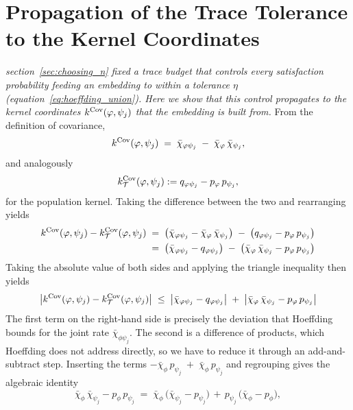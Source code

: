\documentclass[titlepage,a4paper,11pt]{report}
\begin{document}
\section{Propagation of the Trace Tolerance to the Kernel Coordinates}\label{app:tolerance_derivation}
    \emph{section~\ref{sec:choosing_n} fixed a trace budget that controls every satisfaction probability feeding an embedding to within a tolerance $\eta$ (equation~\eqref{eq:hoeffding_union}). Here we show that this control propagates to the kernel coordinates $k^{\mathrm{Cov}}(\varphi,\psi_j)$ that the embedding is built from.} From the definition of covariance,
    \begin{equation}\label{eq:kcov_decomposition}
        k^{\mathrm{Cov}}(\varphi, \psi_j) \;=\;\bar\chi_{\varphi\psi_j} \;-\; \bar\chi_\varphi\, \bar\chi_{\psi_j},
    \end{equation}
    and analogously 
    \begin{equation}
        k^{\mathrm{Cov}}_\mathcal{T}(\varphi, \psi_j) := q_{\varphi\psi_j} - p_\varphi\, p_{\psi_j},
    \end{equation} for the population kernel. Taking the difference between the two and rearranging yields
    \begin{align*}
        k^{\mathrm{Cov}}(\varphi, \psi_j) - k^{\mathrm{Cov}}_\mathcal{T}(\varphi, \psi_j)
        &\;=\; \bigl(\bar\chi_{\varphi\psi_j} - \bar\chi_\varphi\, \bar\chi_{\psi_j}\bigr) \;-\; \bigl(q_{\varphi\psi_j} - p_\varphi\, p_{\psi_j}\bigr) \\
        &\;=\; \bigl(\bar\chi_{\varphi\psi_j} - q_{\varphi\psi_j}\bigr) \;-\; \bigl(\bar\chi_\varphi\, \bar\chi_{\psi_j} - p_\varphi\, p_{\psi_j}\bigr)
    \end{align*}
    Taking the absolute value of both sides and applying the triangle inequality then yields
    \begin{equation}\label{eq:kcov_outer_triangle}
        \bigl|k^{\mathrm{Cov}}(\varphi, \psi_j) - k^{\mathrm{Cov}}_\mathcal{T}(\varphi, \psi_j)\bigr| \;\le\; \bigl|\bar\chi_{\varphi\psi_j} - q_{\varphi\psi_j}\bigr| \;+\; \bigl|\bar\chi_\varphi\, \bar\chi_{\psi_j} - p_\varphi\, p_{\psi_j}\bigr|
    \end{equation}
    The first term on the right-hand side is precisely the deviation that Hoeffding bounds for the joint rate $\bar\chi_{\phi\psi_j}$. The second is a difference of products, which Hoeffding does not address directly, so we have to reduce it through an add-and-subtract step. Inserting the terms $-\bar\chi_\phi \, p_{\psi_j}\;+\; \bar\chi_\phi \, p_{\psi_j}$ and regrouping gives the algebraic identity
    \begin{equation*}
        \bar\chi_\phi\, \bar\chi_{\psi_j} - p_\phi\, p_{\psi_j} \;=\; \bar\chi_\phi\,\bigl(\bar\chi_{\psi_j} - p_{\psi_j}\bigr) \, + \, p_{\psi_j}\,\bigl(\bar\chi_\phi - p_\phi\bigr),
    \end{equation*}
\end{document}
